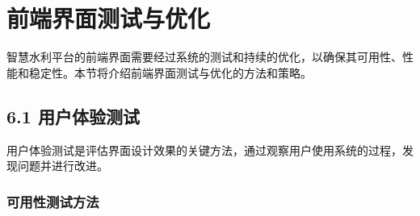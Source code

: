 \section{前端界面测试与优化}\label{ux524dux7aefux754cux9762ux6d4bux8bd5ux4e0eux4f18ux5316}

智慧水利平台的前端界面需要经过系统的测试和持续的优化，以确保其可用性、性能和稳定性。本节将介绍前端界面测试与优化的方法和策略。

\subsection{6.1
用户体验测试}\label{ux7528ux6237ux4f53ux9a8cux6d4bux8bd5}

用户体验测试是评估界面设计效果的关键方法，通过观察用户使用系统的过程，发现问题并进行改进。

\subsubsection{可用性测试方法}\label{ux53efux7528ux6027ux6d4bux8bd5ux65b9ux6cd5}

